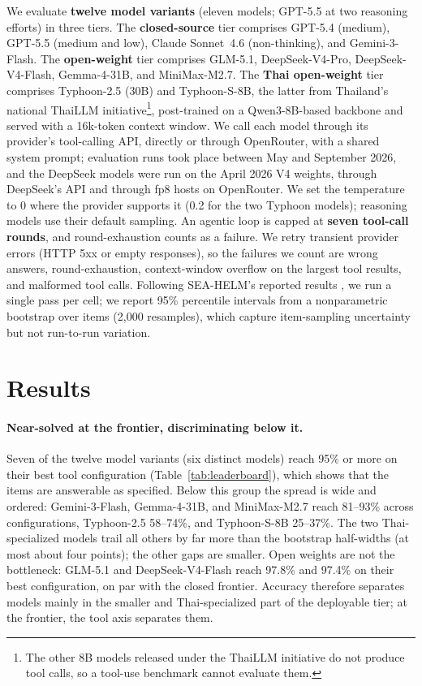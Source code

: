 \documentclass[11pt]{article}
\begin{document}
We evaluate \textbf{twelve model variants} (eleven models; GPT-5.5 at two reasoning efforts) in three
tiers. The \textbf{closed-source} tier comprises GPT-5.4 (medium), GPT-5.5 (medium and low), Claude
Sonnet~4.6 (non-thinking), and Gemini-3-Flash. The \textbf{open-weight} tier comprises GLM-5.1,
DeepSeek-V4-Pro, DeepSeek-V4-Flash, Gemma-4-31B, and MiniMax-M2.7. The \textbf{Thai open-weight} tier
comprises Typhoon-2.5 (30B) and Typhoon-S-8B, the latter from Thailand's national ThaiLLM
initiative\footnote{The other 8B models released under the ThaiLLM initiative do not produce tool calls,
so a tool-use benchmark cannot evaluate them.}, post-trained on a Qwen3-8B-based backbone \citep{qwen3,pipatanakul2026typhoons} and
served with a 16k-token context window. We call each model through its provider's tool-calling API,
directly or through OpenRouter, with a shared system prompt; evaluation runs took place between May and
September 2026, and the DeepSeek models were run on the April 2026 V4 weights, through DeepSeek's API and
through fp8 hosts on OpenRouter. We set the temperature to 0 where the
provider supports it (0.2 for the two Typhoon models); reasoning models use their default sampling. An
agentic loop is capped at \textbf{seven tool-call rounds}, and round-exhaustion counts as a failure. We
retry transient provider errors (HTTP 5xx or empty responses), so the failures we count are wrong answers,
round-exhaustion, context-window overflow on the largest tool results, and malformed tool calls. Following SEA-HELM's reported
results \citep{susanto2025seahelm}, we run a single pass per cell; we report 95\% percentile intervals
from a nonparametric bootstrap over items (2{,}000 resamples), which capture item-sampling uncertainty but
not run-to-run variation.

\section{Results}
\label{sec:results}


\paragraph{Near-solved at the frontier, discriminating below it.} Seven of the twelve model variants (six
distinct models) reach 95\% or more on their best tool configuration (Table~\ref{tab:leaderboard}), which
shows that the items are answerable as specified. Below this group the spread is wide and ordered:
Gemini-3-Flash, Gemma-4-31B, and MiniMax-M2.7 reach 81--93\% across configurations, Typhoon-2.5 58--74\%,
and Typhoon-S-8B 25--37\%. The two Thai-specialized models trail all others by far more than the bootstrap
half-widths (at most about four points); the other gaps are smaller. Open weights are not the bottleneck:
GLM-5.1 and DeepSeek-V4-Flash reach 97.8\% and 97.4\% on their best configuration, on par with the closed
frontier. Accuracy therefore separates models mainly in the smaller and Thai-specialized part of the
deployable tier; at the frontier, the tool axis separates them.
\end{document}
